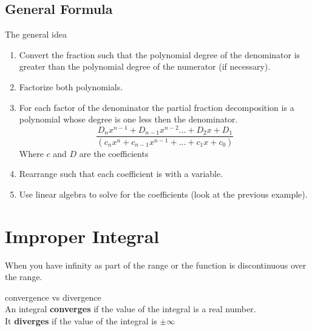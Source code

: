 \documentclass[letterpaper,10pt,twoside,twocolumn,openany]{book}
\begin{document}
\subsection{General Formula}
\begin{DndSidebar}{The general idea}\\
    \begin{enumerate}
        \item Convert the fraction such that the polynomial degree of the denominator is greater than the polynomial degree of the numerator (if necessary).
        \item Factorize both polynomials.
        \item For each factor of the denominator the partial fraction decomposition is a polynomial whose degree is one less then the denominator. 
        \begin{equation}
            \frac{D_nx^{n-1} + D_{n-1}x^{n-2}... + D_2x + D_1}{(c_nx^n + c_{n-1}x^{n-1} + ... + c_1x + c_0)}
        \end{equation} 
        Where $c$ and $D$ are the coefficients
        \item Rearrange such that each coefficient is with a variable.
        \item Use linear algebra to solve for the coefficients (look at the previous example).
    \end{enumerate}
    
\end{DndSidebar}



\section{Improper Integral}
When you have infinity as part of the range or the function is discontinuous over the range.
\begin{DndSidebar}{convergence vs divergence}\\
    An integral \textbf{converges} if the value of the integral is a real number.\\ 
    It \textbf{diverges} if the value of the integral is $\pm\infty$
\end{DndSidebar}
\end{document}
